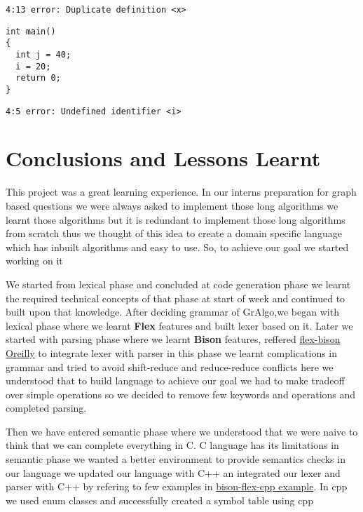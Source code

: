 \documentclass[english,a4paper,12pt]{report}
\begin{document}
\begin{lstlisting}
4:13 error: Duplicate definition <x>
\end{lstlisting}

\begin{lstlisting}[style=CStyle]
int main()
{
  int j = 40;
  i = 20;
  return 0;
}
\end{lstlisting}

\begin{lstlisting}
4:5 error: Undefined identifier <i>
\end{lstlisting}


\chapter{Conclusions and Lessons Learnt}
This project was a great learning experience. In our interns preparation for graph 
based questions we were always asked to implement those long algorithms we learnt 
those algorithms but it is redundant to implement those long algorithms from scratch
thus we thought of this idea to create a domain specific language which has inbuilt
algorithms and easy to use. So, to achieve our goal we started working on it
\null \par \null
We started from lexical phase and concluded at code generation phase we learnt the 
required technical concepts of that phase at start of week and continued to built 
upon that knowledge. After deciding grammar of GrAlgo,we began with lexical phase where we learnt \textbf{Flex} features and built lexer based on it. Later we started
with parsing phase where we learnt \textbf{Bison} features, reffered 
\href{https://github.com/jmparis/flex-bison-oreilly}{flex-bison Oreilly} to 
integrate lexer with parser in this phase we learnt complications in grammar and
tried to avoid shift-reduce and reduce-reduce conflicts here we understood that to
build language to achieve our goal we had to make tradeoff over simple operations
so we decided to remove few keywords and operations and completed parsing. 
\null \par \null
Then we have entered semantic phase where we understood that we were naive to think 
that we can complete everything in C. C language has its limitations in semantic 
phase we wanted a better environment to provide semantics checks in our language
we updated our language with C++ an integrated our lexer and parser with C++  by 
refering to few examples in 
\href{https://github.com/ezaquarii/bison-flex-cpp-example}{bison-flex-cpp example}.
In cpp we used enum classes and successfully created a symbol table using cpp
\end{document}

